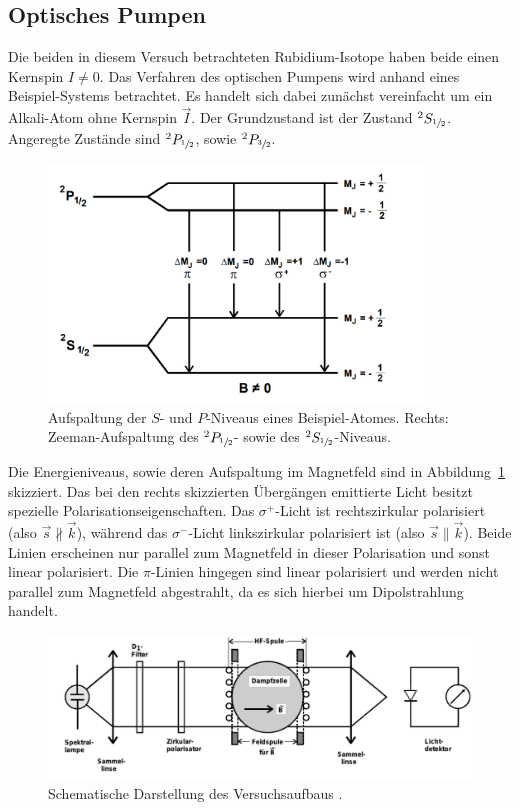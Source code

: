\documentclass[
  bibliography=totoc,     %
  captions=tableheading,  %
  titlepage=firstiscover, %
]{scrartcl}
\begin{document}
\subsection{Optisches Pumpen}
%
Die beiden in diesem Versuch betrachteten Rubidium-Isotope haben beide einen
Kernspin $I \neq 0$. Das Verfahren des optischen Pumpens wird anhand eines Beispiel-Systems
betrachtet. Es handelt sich dabei zunächst vereinfacht um ein Alkali-Atom ohne Kernspin $\vec{I}$.
Der Grundzustand ist der Zustand $^2S_{\sfrac{1}{2}}$. Angeregte Zustände sind
$^2P_{\sfrac{1}{2}}$, sowie $^2P_{\sfrac{3}{2}}$.
%
\begin{figure}[htb]
  \centering
  \includegraphics[width=0.9\textwidth]{Beispiel.jpg}
  \caption{Aufspaltung der $S$- und $P$-Niveaus eines Beispiel-Atomes. Rechts:
  Zeeman-Aufspaltung des $^2P_{\sfrac{1}{2}}$- sowie des
  $^2S_{\sfrac{1}{2}}$-Niveaus. \cite{anleitung}}
  \label{fig:beispiel}
\end{figure}
\noindent
Die Energieniveaus, sowie deren Aufspaltung im Magnetfeld sind in
Abbildung~\ref{fig:beispiel} skizziert. Das bei den rechts skizzierten
Übergängen emittierte Licht besitzt spezielle Polarisationseigenschaften. Das
$\sigma^+$-Licht ist rechtszirkular polarisiert (also
$\vec{s}\nparallel\vec{k}$), während das $\sigma^-$-Licht linkszirkular
polarisiert ist (also $\vec{s}\parallel\vec{k}$). Beide Linien erscheinen nur
parallel zum Magnetfeld in dieser Polarisation und sonst linear polarisiert.
Die $\pi$-Linien hingegen sind linear polarisiert und werden nicht parallel zum
Magnetfeld abgestrahlt, da es sich hierbei um Dipolstrahlung handelt.
%
\begin{figure}[htb]
  \centering
  \includegraphics[width=\textwidth]{Versuchsaufbau.pdf}
  \caption{Schematische Darstellung des Versuchsaufbaus \cite{anleitung}.}
  \label{fig:aufbau}
\end{figure}
\end{document}
